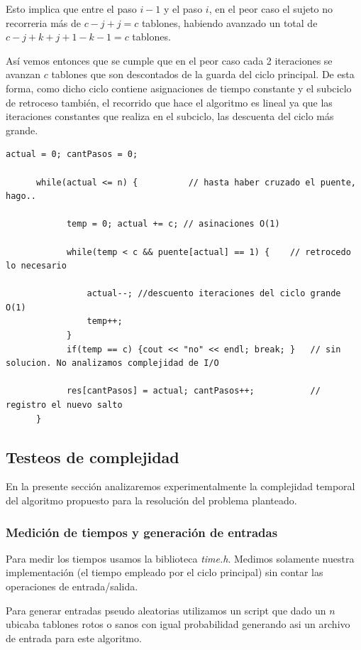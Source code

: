 Esto implica que entre el paso $i-1$ y el paso $i$, en el peor caso el sujeto no recorreria m\'as de $c-j+j=c$ tablones, habiendo avanzado un total de $c-j+k+j+1-k-1 = c$ tablones.

As\'i vemos entonces que se cumple que en el peor caso cada 2 iteraciones se avanzan $c$ tablones que son descontados de la guarda del ciclo principal. De esta forma, como dicho ciclo contiene asignaciones de tiempo constante y el subciclo de retroceso también, el recorrido que hace el algoritmo es lineal ya que las iteraciones constantes que realiza en el subciclo, las descuenta del ciclo más grande.

\begin{lstlisting}[caption=Fragmento de código c++ encargado del ciclo principal y el subciclo de retroceso]
	  actual = 0; cantPasos = 0;	

	  while(actual <= n) {			// hasta haber cruzado el puente, hago..
		
			temp = 0; actual += c; // asinaciones O(1)
		
			while(temp < c && puente[actual] == 1) {	// retrocedo lo necesario	
														
			    actual--; //descuento iteraciones del ciclo grande O(1)
			    temp++;
		    }
		    if(temp == c) {cout << "no" << endl; break; }	// sin solucion. No analizamos complejidad de I/O
		
	        res[cantPasos] = actual; cantPasos++;			// registro el nuevo salto
	  }
\end{lstlisting}


\subsection{Testeos de complejidad}
En la presente sección analizaremos experimentalmente la complejidad temporal del algoritmo propuesto para la resolución del problema planteado.

\subsubsection{Medición de tiempos y generación de entradas}
Para medir los tiempos usamos la biblioteca \textit{time.h}. Medimos solamente nuestra implementación (el tiempo empleado por el ciclo principal) sin contar las operaciones de entrada/salida.  

Para generar entradas pseudo aleatorias utilizamos un script que dado un $n$ ubicaba tablones rotos o sanos con igual probabilidad generando asi un archivo de entrada para este algoritmo.


